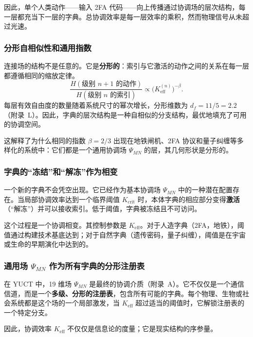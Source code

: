 \documentclass[12pt,a4paper]{article}
\theoremstyle{remark}
\begin{document}
	因此，单个人类动作——输入 2FA 代码——向上传播通过协调场的层次结构，每一层都充当下一层的字典。总协调效率是每一层效率的乘积，然而物理信号从未超过光速。
	
	\subsubsection{分形自相似性和通用指数}
	
	连接场的结构不是任意的。它是\textbf{分形的}：索引与它激活的动作之间的关系在每一层都遵循相同的缩放定律。
	\[
	\frac{H(\text{级别 } n+1 \text{ 的动作})}{H(\text{级别 } n \text{ 的索引})}
	\propto \bigl(K_{\mathrm{eff}}^{(n)}\bigr)^{-\beta}.
	\]
	每层有效自由度的数量随着系统尺寸的幂次增长，分形维数为 $d_f = 11/5 = 2.2$（附录~L）。因此，字典的层次结构是一种自相似的分支结构，最优地填充了可用的协调空间。
	
	这解释了为什么相同的指数 $\beta=2/3$ 出现在地铁闸机、2FA 协议和量子纠缠等多样化的系统中：它们都是一个通用协调场 $\Psi_{MN}$ 的层，其几何形状是分形的。
	
	\subsubsection{字典的“冻结”和“解冻”作为相变}
	
	一个新的字典不会凭空出现。它已经作为基本协调场 $\Psi_{MN}$ 中的一种潜在配置存在。当局部协调效率达到一个临界阈值 $K_{\mathrm{crit}}$ 时，本体字典的相应部分变得\textbf{激活}（“解冻”）并可以接收索引。低于阈值，字典被冻结且不可访问。
	
	这个过程是一个协调相变。其控制参数是 $K_{\mathrm{eff}}$。对于人造字典（2FA，地铁），阈值通过构建技术基底达到；对于自然字典（遗传密码，量子纠缠），阈值是在宇宙或生命的早期演化中达到的。
	
	\subsubsection{通用场 \(\Psi_{MN}\) 作为所有字典的分形注册表}
	
	在 YUCT 中，19 维场 $\Psi_{MN}$ 是最终的协调介质（附录~A）。它不仅仅是一个通信信道，而是一个\textbf{多级、分形的注册表}，包含所有可能的字典。每个物理、生物或社会系统都是这个场的一个局部激发，当 $K_{\mathrm{eff}}$ 超过适当的阈值时，它解锁注册表的一个特定分支。
	
	因此，协调效率 $K_{\mathrm{eff}}$ 不仅仅是信息论的度量；它是现实结构的序参量。
	
\end{document}
